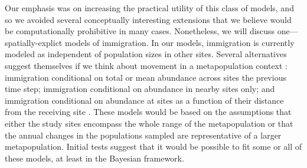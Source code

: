 \documentclass[12pt]{article}
\begin{document}
Our emphasis was on increasing the practical utility of this
class of models, and so we avoided several conceptually interesting
extensions that we believe would be computationally prohibitive in many
cases. Nonetheless, we will discuss one---spatially-explict models of
immigration. 
In our models, immigration is currently modeled as independent of
population sizes in other sites. Several alternatives suggest
themselves if we think about movement in a metapopulation
context \citep{hanski:1998}: immigration conditional on total or mean
abundance across sites the previous time step; immigration
conditional on abundance in nearby sites only; and immigration
conditional on abundance at sites as a function of their distance
from the receiving site \citep{hastings:1991,hanski:1998}. These models would
be based on the assumptions that either the study sites
encompass the whole range of the metapopulation or that the
annual changes in the populations sampled are representative of
a larger metapopulation. Initial tests suggest that it would be
possible to fit some or all of these models, at least in the
Bayesian framework.

\end{document}
